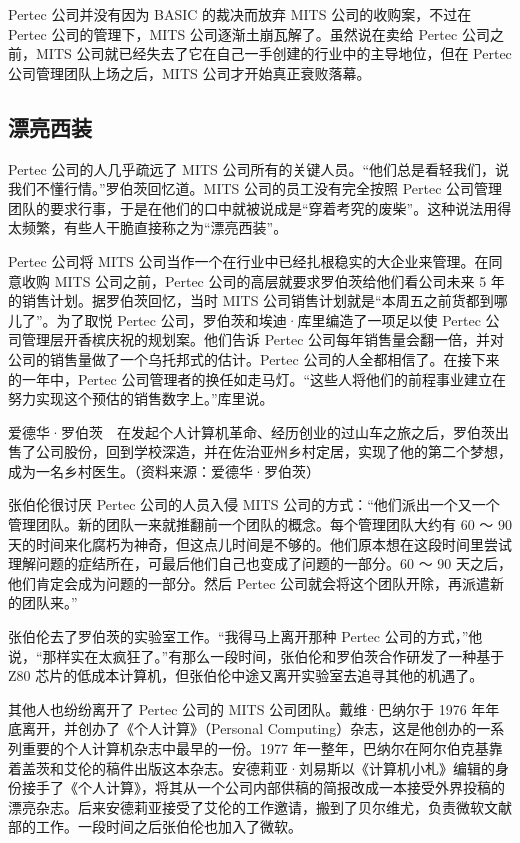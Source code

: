 \documentclass[12pt,UTF8]{ctexbook}
\begin{document}
Pertec 公司并没有因为 BASIC 的裁决而放弃 MITS 公司的收购案，不过在 Pertec 公司的管理下，MITS 公司逐渐土崩瓦解了。虽然说在卖给 Pertec 公司之前，MITS 公司就已经失去了它在自己一手创建的行业中的主导地位，但在 Pertec 公司管理团队上场之后，MITS 公司才开始真正衰败落幕。





\subsection{漂亮西装}


Pertec 公司的人几乎疏远了 MITS 公司所有的关键人员。“他们总是看轻我们，说我们不懂行情。”罗伯茨回忆道。MITS 公司的员工没有完全按照 Pertec 公司管理团队的要求行事，于是在他们的口中就被说成是“穿着考究的废柴”。这种说法用得太频繁，有些人干脆直接称之为“漂亮西装”。

Pertec 公司将 MITS 公司当作一个在行业中已经扎根稳实的大企业来管理。在同意收购 MITS 公司之前，Pertec 公司的高层就要求罗伯茨给他们看公司未来 5 年的销售计划。据罗伯茨回忆，当时 MITS 公司销售计划就是“本周五之前货都到哪儿了”。为了取悦 Pertec 公司，罗伯茨和埃迪·库里编造了一项足以使 Pertec 公司管理层开香槟庆祝的规划案。他们告诉 Pertec 公司每年销售量会翻一倍，并对公司的销售量做了一个乌托邦式的估计。Pertec 公司的人全都相信了。在接下来的一年中，Pertec 公司管理者的换任如走马灯。“这些人将他们的前程事业建立在努力实现这个预估的销售数字上。”库里说。



爱德华·罗伯茨　在发起个人计算机革命、经历创业的过山车之旅之后，罗伯茨出售了公司股份，回到学校深造，并在佐治亚州乡村定居，实现了他的第二个梦想，成为一名乡村医生。（资料来源：爱德华·罗伯茨）

张伯伦很讨厌 Pertec 公司的人员入侵 MITS 公司的方式：“他们派出一个又一个管理团队。新的团队一来就推翻前一个团队的概念。每个管理团队大约有 60 ～ 90 天的时间来化腐朽为神奇，但这点儿时间是不够的。他们原本想在这段时间里尝试理解问题的症结所在，可最后他们自己也变成了问题的一部分。60 ～ 90 天之后，他们肯定会成为问题的一部分。然后 Pertec 公司就会将这个团队开除，再派遣新的团队来。”

张伯伦去了罗伯茨的实验室工作。“我得马上离开那种 Pertec 公司的方式，”他说，“那样实在太疯狂了。”有那么一段时间，张伯伦和罗伯茨合作研发了一种基于 Z80 芯片的低成本计算机，但张伯伦中途又离开实验室去追寻其他的机遇了。

其他人也纷纷离开了 Pertec 公司的 MITS 公司团队。戴维·巴纳尔于 1976 年年底离开，并创办了《个人计算》（Personal Computing）杂志，这是他创办的一系列重要的个人计算机杂志中最早的一份。1977 年一整年，巴纳尔在阿尔伯克基靠着盖茨和艾伦的稿件出版这本杂志。安德莉亚·刘易斯以《计算机小札》编辑的身份接手了《个人计算》，将其从一个公司内部供稿的简报改成一本接受外界投稿的漂亮杂志。后来安德莉亚接受了艾伦的工作邀请，搬到了贝尔维尤，负责微软文献部的工作。一段时间之后张伯伦也加入了微软。
\end{document}
